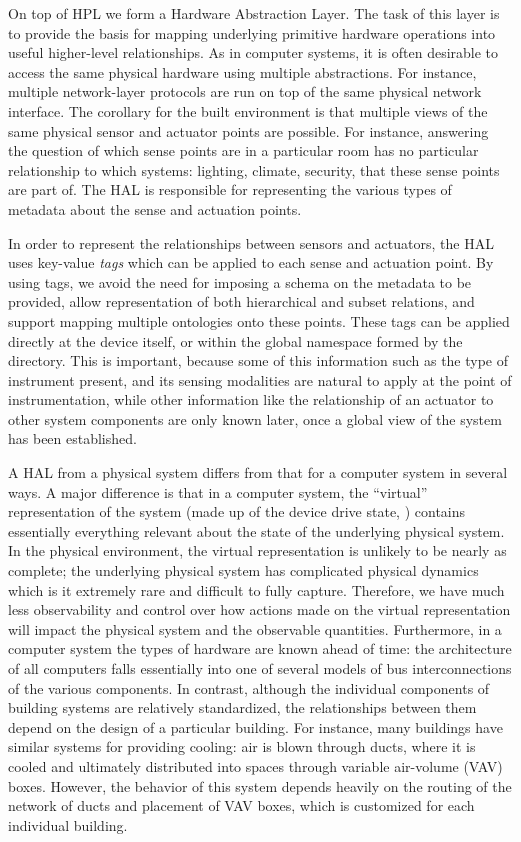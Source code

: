 On top of HPL we form a Hardware Abstraction Layer.  The task of this layer is to provide the basis for mapping  underlying primitive hardware operations into useful higher-level relationships.  As in computer systems, it is often desirable to access the same physical hardware using multiple abstractions.  For instance, multiple network-layer protocols are run on top of the same physical network interface.  The corollary for the built environment is that multiple views of the same physical sensor and actuator points are possible.  For instance, answering the question of which sense points are in a particular room has no particular relationship to which systems: lighting, climate, security, that these sense points are part of. The HAL is responsible for representing the various types of metadata about the sense and actuation points.

In order to represent the relationships between sensors and actuators, the HAL uses key-value {\it tags} which can be applied to each sense and actuation point.  By using tags, we avoid the need for imposing a schema on the metadata to be provided, allow representation of both hierarchical and subset relations, and support mapping multiple ontologies onto these points.  These tags can be applied directly at the device itself, or within the global namespace formed by the directory.  This is important, because some of this information such as the type of instrument present, and its sensing modalities are natural to apply at the point of instrumentation, while other information like the relationship of an actuator to other system components are only known later, once a global view of the system has been established.

A HAL from a physical system differs from that for a computer system in several ways.  A major difference is that in a computer system, the ``virtual'' representation of the system (made up of the device drive state, \etc) contains essentially everything relevant about the state of the underlying physical system.  In the physical environment, the virtual representation is unlikely to be nearly as complete; the underlying physical system has complicated physical dynamics which is it extremely rare and difficult to fully capture.  Therefore, we have much less observability and control over how actions made on the virtual representation will impact the physical system and the observable quantities.  Furthermore, in a computer system the types of hardware are known ahead of time: the architecture of all computers falls essentially into one of several models of bus interconnections of the various components.  In contrast, although the individual components of building systems are relatively standardized, the relationships between them depend on the design of a particular building.    For instance, many buildings have similar systems for providing cooling: air is blown through ducts, where it is cooled and ultimately distributed into spaces through variable air-volume (VAV) boxes.  However, the behavior of this system depends heavily on the routing of the network of ducts and placement of VAV boxes, which is customized for each individual building.


